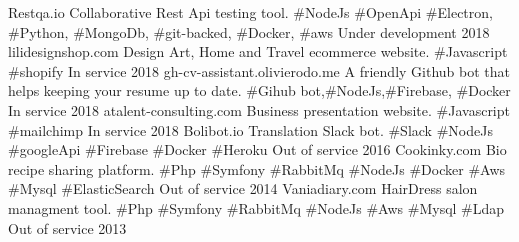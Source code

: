 
\begin{cvhonors}

  \cvhonor
    {Restqa.io} %
    {Collaborative Rest Api testing tool. \#NodeJs  \#OpenApi \#Electron, \#Python,  \#MongoDb, \#git-backed, \#Docker, \#aws}
    {Under development} %
    {2018} %
  \cvhonor
    {lilidesignshop.com} %
    {Design Art, Home and Travel ecommerce website. \#Javascript \#shopify}
    {In service} %
    {2018} %
  \cvhonor
    {gh-cv-assistant.olivierodo.me} %
    {A friendly Github bot that helps keeping your resume up to date. \#Gihub bot,\#NodeJs,\#Firebase, \#Docker}
    {In service} %
    {2018} %
  \cvhonor
    {atalent-consulting.com} %
    {Business presentation website. \#Javascript \#mailchimp}
    {In service} %
    {2018} %
  \cvhonor
    {Bolibot.io} %
    {Translation Slack bot.  \#Slack \#NodeJs \#googleApi \#Firebase \#Docker \#Heroku}
    {Out of service} %
    {2016} %
  \cvhonor
    {Cookinky.com} %
    {Bio recipe sharing platform. \#Php \#Symfony \#RabbitMq \#NodeJs  \#Docker \#Aws \#Mysql \#ElasticSearch}
    {Out of service} %
    {2014} %
  \cvhonor
    {Vaniadiary.com} %
    {HairDress salon managment tool. \#Php \#Symfony \#RabbitMq \#NodeJs \#Aws \#Mysql \#Ldap}
    {Out of service} %
    {2013} %

\end{cvhonors}
